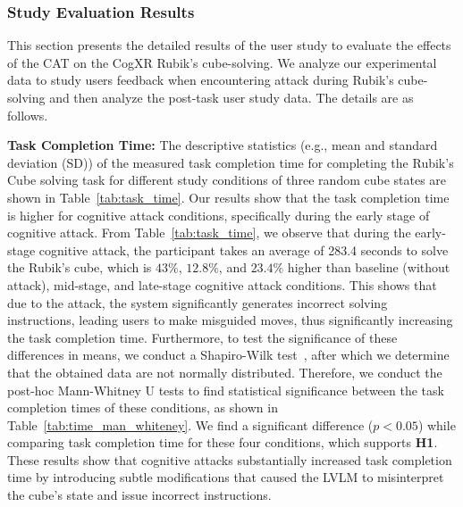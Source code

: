 \documentclass[sigconf,review,anonymous]{acmart}
\begin{document}
\subsubsection{Study Evaluation Results}
\label{sec:cuberesult}
This section presents the detailed results of the user study to evaluate the effects of the  CAT on the CogXR Rubik's cube-solving. We analyze our experimental data to study users feedback when encountering attack during Rubik’s cube-solving and then analyze the post-task user study data. The details are as follows.

\textbf{Task Completion Time:} The descriptive statistics (e.g., mean and standard deviation (SD)) of the measured task completion time for completing the Rubik's Cube solving task for different study conditions of three random cube states are shown in Table~\ref{tab:task_time}. Our results show that the task completion time is higher for cognitive attack conditions, specifically during the early stage of cognitive attack. From Table~\ref{tab:task_time}, we observe that during the early-stage cognitive attack, the participant takes an average of 283.4 seconds to solve the Rubik’s cube, which is $43\%$, $12.8\%$, and $23.4\%$ higher than baseline (without attack), mid-stage, and late-stage cognitive attack conditions. This shows that due to the attack, the system significantly generates incorrect solving instructions, leading users to make misguided moves, thus significantly increasing the task completion time. Furthermore, to test the significance of these differences in means, we conduct a Shapiro-Wilk test~\cite{razali2011power}, after which we determine that the obtained data are not normally distributed. Therefore, we conduct the post-hoc Mann-Whitney U tests to find statistical significance between the task completion times of these conditions, as shown in Table~\ref{tab:time_man_whiteney}. We find a significant difference ($p < 0.05$) while comparing task completion time for these four conditions, which supports \textbf{H1}. These results show that cognitive attacks substantially increased task completion time by introducing subtle modifications that caused the LVLM to misinterpret the cube’s state and issue incorrect instructions.
\end{document}
